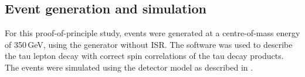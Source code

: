 






\subsection{Event generation and simulation}

For this proof-of-principle study, \eeZZQQ events were generated at a centre-of-mass energy of 350\,GeV, using the \WHIZARD generator without ISR. The \TAUOLA software was used to describe the tau lepton decay with correct spin correlations of the tau decay products. The \eeZZQQ events were simulated using the \ILD detector model as described in .




